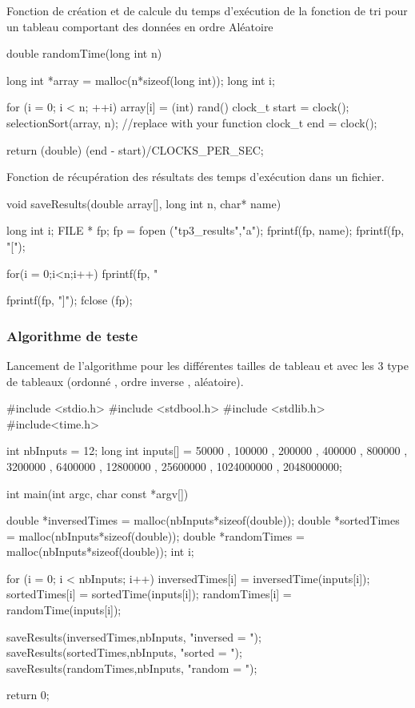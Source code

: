 \documentclass[12pt]{article}
\begin{document}
Fonction de création et de calcule du temps d'exécution de la fonction de tri pour un tableau comportant des données en ordre Aléatoire
\begin{sql}
double randomTime(long int n) {
    
  long int *array = malloc(n*sizeof(long int));
  long int i;
  
  for (i = 0; i < n; ++i)
  {
    array[i] = (int) rand()%
  }
  clock_t start = clock();
  selectionSort(array, n); //replace with your function 
  clock_t end = clock();

  return (double) (end - start)/CLOCKS_PER_SEC;
}
\end{sql}

Fonction de récupération des résultats des temps d'exécution dans un fichier.
\begin{sql}
  void saveResults(double array[], long int n, char* name) {

     long int i;
     FILE * fp;
     fp = fopen ("tp3_results","a");
     fprintf(fp, name);
     fprintf(fp, "[");

     for(i = 0;i<n;i++) {
      fprintf(fp, "%
     }

     fprintf(fp, "]\n");
     fclose (fp);
  }
\end{sql}

\subsubsection{Algorithme de teste }
Lancement de l'algorithme pour les différentes tailles de tableau et avec les 3 type de tableaux (ordonné , ordre inverse , aléatoire).

\begin{sql}
#include <stdio.h>
#include <stdbool.h>
#include <stdlib.h>
#include<time.h>

int nbInputs = 12;
long int inputs[] = {50000 , 100000 , 200000 , 400000 , 800000 , 3200000 , 6400000 , 12800000 , 25600000 , 1024000000 , 2048000000};
         
int main(int argc, char const *argv[])
  {
  double *inversedTimes = malloc(nbInputs*sizeof(double));
  double *sortedTimes = malloc(nbInputs*sizeof(double));
  double *randomTimes = malloc(nbInputs*sizeof(double));
  int i;

  for (i = 0; i < nbInputs; i++)
  {
    inversedTimes[i] = inversedTime(inputs[i]);
    sortedTimes[i] = sortedTime(inputs[i]);
    randomTimes[i] = randomTime(inputs[i]);
  }

  saveResults(inversedTimes,nbInputs, "inversed = ");
  saveResults(sortedTimes,nbInputs, "sorted = ");
  saveResults(randomTimes,nbInputs, "random = ");

  return 0;
  }
\end{sql}
\end{document}
